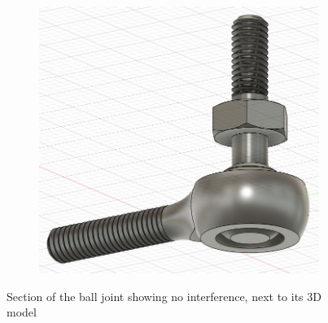 \documentclass[a4paper, 10pt]{article}
\begin{document}
\begin{figure}[h]
\begin{subfigure}[h]{0.34\textwidth}
			\end{subfigure}
			\hfill
			\begin{subfigure}[h]{0.65\textwidth}
				\centering
				\includegraphics[width=\textwidth]{ball_joint}
			\end{subfigure}
			\centering
			\caption{Section of the ball joint showing no interference, next to its 3D model}
			\label{ball_joint}
		\end{figure}
		
\end{document}
